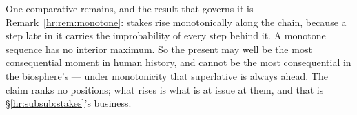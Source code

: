 \documentclass[11pt]{article}
\numberwithin{equation}{section}
\theoremstyle{plain}
\theoremstyle{definition}
\theoremstyle{remark}
\begin{document}
One comparative remains, and the result that governs it is Remark~\ref{hr:rem:monotone}: stakes rise monotonically along the chain, because a step late in it carries the improbability of every step behind it. A monotone sequence has no interior maximum. So the present may well be the most consequential moment in human history, and cannot be the most consequential in the biosphere's --- under monotonicity that superlative is always ahead. The claim ranks no positions; what rises is what is at issue at them, and that is \S\ref{hr:subsub:stakes}'s business.

%
%
%

\end{document}

